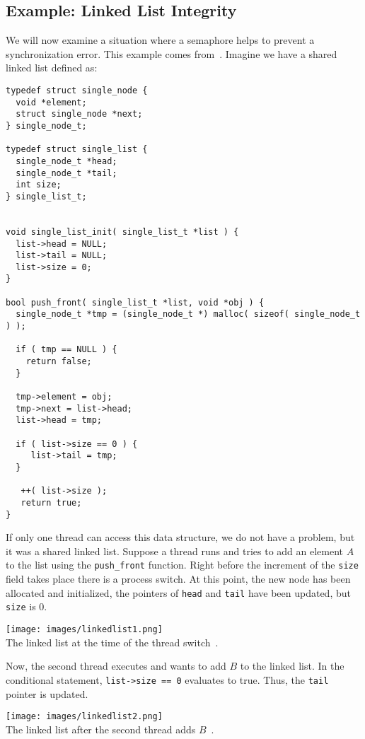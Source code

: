 \subsection*{Example: Linked List Integrity}
We will now examine a situation where a semaphore helps to prevent a synchronization error. This example comes from~\cite{mte241}. Imagine we have a shared linked list defined as:

\begin{verbatim}
typedef struct single_node {
  void *element;
  struct single_node *next;
} single_node_t;

typedef struct single_list {
  single_node_t *head;
  single_node_t *tail;
  int size;
} single_list_t;


void single_list_init( single_list_t *list ) {
  list->head = NULL;
  list->tail = NULL;
  list->size = 0;
}

bool push_front( single_list_t *list, void *obj ) {
  single_node_t *tmp = (single_node_t *) malloc( sizeof( single_node_t ) );
  
  if ( tmp == NULL ) {
    return false;
  }
  
  tmp->element = obj;
  tmp->next = list->head;
  list->head = tmp;

  if ( list->size == 0 ) {
     list->tail = tmp;
  }
  
   ++( list->size );
   return true;
}
\end{verbatim}

If only one thread can access this data structure, we do not have a problem, but it was a shared linked list. Suppose a thread runs and tries to add an element $A$ to the list using the \texttt{push\_front} function. Right before the increment of the \texttt{size} field takes place there is a process switch. At this point, the new node has been allocated and initialized, the pointers of \texttt{head} and \texttt{tail} have been updated, but \texttt{size} is 0. 

\begin{center}
\texttt{[image: images/linkedlist1.png]}\\
The linked list at the time of the thread switch~\cite{mte241}.
\end{center}

Now, the second thread executes and wants to add $B$ to the linked list. In the conditional statement, \texttt{list->size == 0} evaluates to true. Thus, the \texttt{tail} pointer is updated.

\begin{center}
\texttt{[image: images/linkedlist2.png]}\\
The linked list after the second thread adds $B$~\cite{mte241}.
\end{center}

